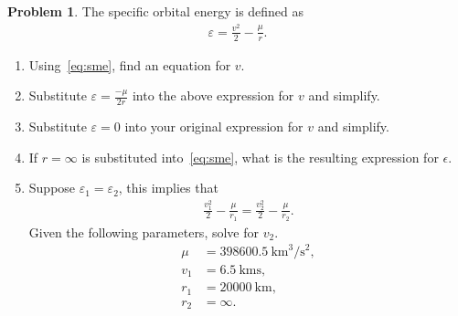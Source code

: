 \documentclass[10pt]{article}
\theoremstyle{definition}
\newtheorem{prob}{Problem}[section]
\newenvironment{subprob}%
{\renewcommand{\theenumi}{\alph{enumi}}\renewcommand{\labelenumi}{(\theenumi)}\begin{enumerate}}%
{\end{enumerate}}%
\begin{document}
\begin{prob}
    The specific orbital energy is defined as
    \begin{align}\label{eq:sme}
        \varepsilon = \frac{v^2}{2} - \frac{\mu}{r} .
    \end{align}
    
    \begin{subprob}
        \item Using~\cref{eq:sme}, find an equation for \( v \).
        \item Substitute \( \varepsilon = \frac{-\mu}{2 r} \) into the above expression for \( v \) and simplify.
        \item Substitute \( \varepsilon = 0 \) into your original expression for \( v \) and simplify.
        \item If \( r = \infty \) is substituted into~\cref{eq:sme}, what is the resulting expression for \( \epsilon \).
        \item Suppose \( \varepsilon_1 = \varepsilon_2 \), this implies that
            \begin{align*}
                \frac{v_1^2}{2} - \frac{\mu}{r_1} = \frac{v_2^2}{2} - \frac{\mu}{r_2} .
            \end{align*}
            Given the following parameters, solve for \( v_2 \).
            \begin{align*}
                \mu &= \SI{398600.5}{\kilo\meter\cubed\per\second\squared} , \\
                v_1 &= \SI{6.5}{\kilo\meter\second}, \\
                r_1 &= \SI{20000}{\kilo\meter} , \\
                r_2 &= \infty .
            \end{align*}
    \end{subprob}
\end{prob}

\newpage
\end{document}
